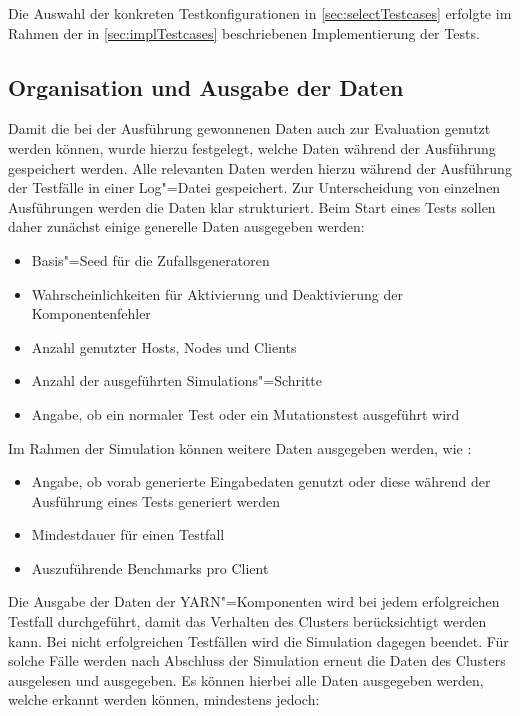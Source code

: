 Die Auswahl der konkreten Testkonfigurationen in \cref{sec:selectTestcases} erfolgte im Rahmen der in \cref{sec:implTestcases} beschriebenen Implementierung der Tests.

\subsection{Organisation und Ausgabe der Daten}
\label{subsec:dataOrganisation}

Damit die bei der Ausführung gewonnenen Daten auch zur Evaluation genutzt werden können, wurde hierzu festgelegt, welche Daten während der Ausführung gespeichert werden.
Alle relevanten Daten werden hierzu während der Ausführung der Testfälle in einer Log"=Datei gespeichert.
Zur Unterscheidung von einzelnen Ausführungen werden die Daten klar strukturiert.
Beim Start eines Tests sollen daher zunächst einige generelle Daten ausgegeben werden:

\begin{itemize}
    \item Basis"=Seed für die Zufallsgeneratoren
    \item Wahrscheinlichkeiten für Aktivierung und Deaktivierung der Komponentenfehler
    \item Anzahl genutzter Hosts, Nodes und Clients
    \item Anzahl der ausgeführten Simulations"=Schritte
    \item Angabe, ob ein normaler Test oder ein Mutationstest ausgeführt wird
\end{itemize}

Im Rahmen der Simulation können weitere Daten ausgegeben werden, wie \zB:

\begin{itemize}
    \item Angabe, ob vorab generierte Eingabedaten genutzt oder diese während der Ausführung eines Tests generiert werden
    \item Mindestdauer für einen Testfall
    \item Auszuführende Benchmarks pro Client
\end{itemize}

Die Ausgabe der Daten der YARN"=Komponenten wird bei jedem erfolgreichen Testfall durchgeführt, damit das Verhalten des Clusters berücksichtigt werden kann.
Bei nicht erfolgreichen Testfällen wird die Simulation dagegen beendet.
Für solche Fälle werden nach Abschluss der Simulation erneut die Daten des Clusters ausgelesen und ausgegeben.
Es können hierbei alle Daten ausgegeben werden, welche erkannt werden können, mindestens jedoch:

